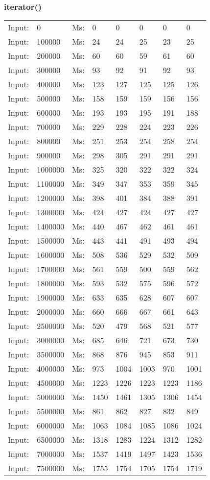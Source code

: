 \documentclass[11pt,a4paper]{report}
\begin{document}
\begin{tiny}
\subsubsection*{iterator()}
\begin{tabular}{l l ||l  l  l  l  l  l}
Input:&0&Ms:&0&0&0&0&0\\
Input:&100000&Ms:&24&24&25&23&25\\
Input:&200000&Ms:&60&60&59&61&60\\
Input:&300000&Ms:&93&92&91&92&93\\
Input:&400000&Ms:&123&127&125&125&126\\
Input:&500000&Ms:&158&159&159&156&156\\
Input:&600000&Ms:&193&193&195&191&188\\
Input:&700000&Ms:&229&228&224&223&226\\
Input:&800000&Ms:&251&253&254&258&254\\
Input:&900000&Ms:&298&305&291&291&291\\
Input:&1000000&Ms:&325&320&322&322&324\\
Input:&1100000&Ms:&349&347&353&359&345\\
Input:&1200000&Ms:&398&401&384&388&391\\
Input:&1300000&Ms:&424&427&424&427&427\\
Input:&1400000&Ms:&440&467&462&461&461\\
Input:&1500000&Ms:&443&441&491&493&494\\
Input:&1600000&Ms:&508&536&529&532&509\\
Input:&1700000&Ms:&561&559&500&559&562\\
Input:&1800000&Ms:&593&532&575&596&572\\
Input:&1900000&Ms:&633&635&628&607&607\\
Input:&2000000&Ms:&660&666&667&661&643\\
Input:&2500000&Ms:&520&479&568&521&577\\
Input:&3000000&Ms:&685&646&721&673&730\\
Input:&3500000&Ms:&868&876&945&853&911\\
Input:&4000000&Ms:&973&1004&1003&970&1001\\
Input:&4500000&Ms:&1223&1226&1223&1223&1186\\
Input:&5000000&Ms:&1450&1461&1305&1306&1454\\
Input:&5500000&Ms:&861&862&827&832&849\\
Input:&6000000&Ms:&1063&1084&1085&1086&1024\\
Input:&6500000&Ms:&1318&1283&1224&1312&1282\\
Input:&7000000&Ms:&1537&1419&1497&1423&1536\\
Input:&7500000&Ms:&1755&1754&1705&1754&1719\\
\end{tabular}


\end{tiny}
\end{document}
